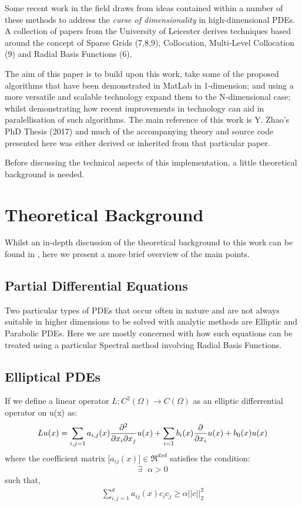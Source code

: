 \documentclass[a4paper]{amsart}
\begin{document}
Some recent work in the field draws from ideas contained within a number of these methods to address the \emph{curse of dimensionality} in high-dimensional PDEs. A collection of papers from the University of Leicester\cite{mski0} \cite{mski1} \cite{mski2} derives techniques based around the concept of Sparse Grids (7,8,9), Collocation, Multi-Level Collocation (9) and Radial Basis Functions (6).

The aim of this paper is to build upon this work, take some of the proposed algorithms that have been demonstrated in MatLab in 1-dimension; and using a more versatile and scalable technology expand them to the N-dimensional case; whilst demonstrating how recent improvements in technology can aid in paralellisation of such algorithms. The main reference of this work is Y. Zhao's PhD Thesis (2017) \cite{mski0} and much of the accompanying theory and source code presented here was either derived or inherited from that particular paper.

Before discussing the technical aspects of this implementation, a little theoretical background is needed.

\newpage

\section{Theoretical Background}
Whilst an in-depth discussion of the theoretical background to this work can be found in \cite{mski0}, here we present a more brief overview of the main points.

\subsection{Partial Differential Equations}
Two particular types of PDEs that occur often in nature and are not always suitable in higher dimensions to be solved with analytic methods are Elliptic and Parabolic PDEs. Here we are mostly concerned with how such equations can be treated using a particular Spectral method involving Radial Basis Functions.

\subsection{Elliptical PDEs} \label{EPDE}
If we define a linear operator $L : C^{2} (\Omega) \rightarrow C(\Omega)$ as an elliptic differrential operator on u(x) as:
\begin{equation}
Lu(x) = \sum_{i,j=1} a_{i,j}(x) \pdv{}{x_i}{x_j} u(x) + \sum_{i=1} b_{i}(x) \pdv{}{x_i} u(x) + b_{0}(x) u(x)
\label{EPDE}
\end{equation}
where the coefficient matrix $\big[ a_{ij}(x) \big] \in \Re^{dxd}$ satisfies the condition:
\begin{align*}
\exists \mbox{  } \alpha > 0
\end{align*}
 such that,
\begin{align*}
\sum_{i,j=1}^{d} a_{ij}(x)c_{i}c_{j}\geq \alpha||c||_{2}^{2}
\end{align*}
\end{document}
